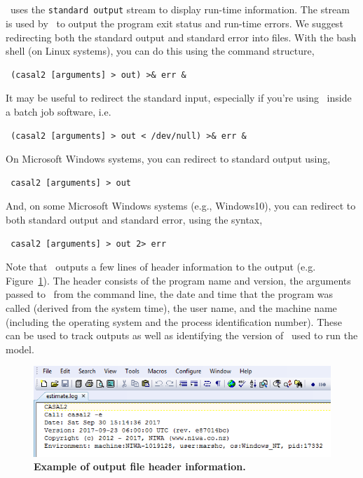 \subsection{\label{sec:redirecting-stdout}}

\CNAME\ uses the \texttt{standard output} stream to display run-time information. The  stream is used by \CNAME\ to output the program exit status and run-time errors. We suggest redirecting both the standard output and standard error into files. With the bash shell (on Linux systems), you can do this using the command structure,

\begin{verbatim} (casal2 [arguments] > out) >& err &\end{verbatim}

It may be useful to redirect the standard input, especially if you're using \CNAME\ inside a batch job software, i.e. 

\begin{verbatim} (casal2 [arguments] > out < /dev/null) >& err &\end{verbatim}

On Microsoft Windows systems, you can redirect to standard output using,

\begin{verbatim} casal2 [arguments] > out\end{verbatim}

And, on some Microsoft Windows systems (e.g., Windows10), you can redirect to both standard output and standard error, using the syntax, 

\begin{verbatim} casal2 [arguments] > out 2> err\end{verbatim}

Note that \CNAME\ outputs a few lines of header information to the output (e.g. Figure~\ref{fig:log_file_1}). The header consists of the program name and version, the arguments passed to \CNAME\ from the command line, the date and time that the program was called (derived from the system time), the user name, and the machine name (including the operating system and the process identification number). These can be used to track outputs as well as identifying the version of \CNAME\ used to run the model.

\begin{figure}[htp]
	\includegraphics[scale=1]{Figures/eglog.png}
	\caption{\textbf{Example of output file header information.}}\label{fig:log_file_1}
\end{figure}

